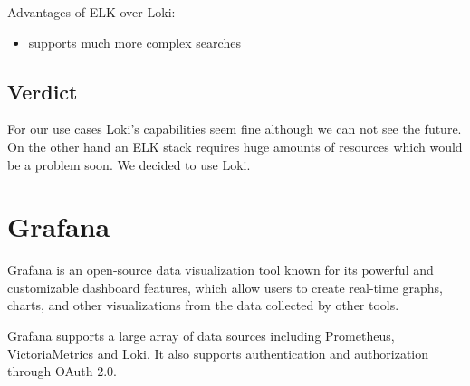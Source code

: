 Advantages of ELK over Loki:
\begin{itemize}
	\item supports much more complex searches
\end{itemize}

\subsection{Verdict}

For our use cases Loki's capabilities seem fine although we can not see the
future. On the other hand an ELK stack requires huge amounts of resources which
would be a problem soon. We decided to use Loki.

\section{Grafana \label{bbGrafana}}

Grafana\cite{g} is an open-source data visualization tool known for its powerful and
customizable dashboard features, which allow users to create real-time graphs,
charts, and other visualizations from the data collected by other tools.

Grafana supports a large array of data sources including Prometheus,
VictoriaMetrics and Loki. It also supports authentication and authorization
through OAuth 2.0.
